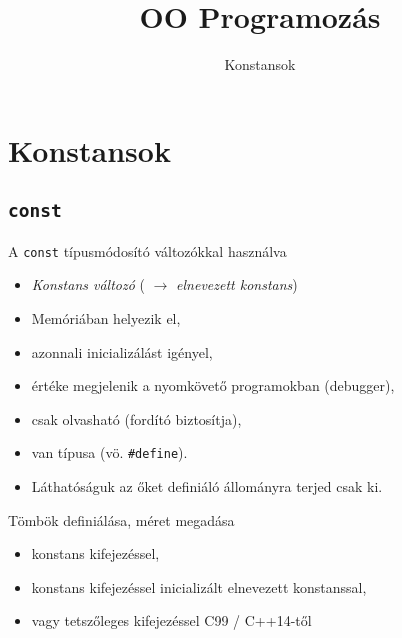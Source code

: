 \documentclass[usenames,dvipsnames,aspectratio=169]{beamer}
\title[OO Programozás - C++]{OO Programozás}
\subtitle{Konstansok}
\begin{document}
\begin{frame}[plain]
  \titlepage
  \logoalul
\end{frame}

\section{Konstansok}

\subsection{\texttt{const}}

\begin{frame}
    A \texttt{const} típusmódosító változókkal használva
    \begin{itemize}
        \footnotesize
        \item \emph{Konstans változó} ( $\to$ \emph{elnevezett konstans})
        \item Memóriában helyezik el,
        \item azonnali inicializálást igényel, 
        \item értéke megjelenik a nyomkövető programokban (debugger),
        \item csak olvasható (fordító biztosítja),
        \item van típusa (vö. \texttt{\#define}).
        \item Láthatóságuk az őket definiáló állományra terjed csak ki.
    \end{itemize}
    \vfill
    Tömbök definiálása, méret megadása
    \begin{itemize}
        \footnotesize
        \item konstans kifejezéssel,
        \item konstans kifejezéssel inicializált elnevezett konstanssal,
        \item vagy tetszőleges kifejezéssel C99 / C++14-től
    \end{itemize}
\end{frame}

\begin{frame}
    \begin{exampleblock}{}
        
    \end{exampleblock}
\end{frame}

\begin{frame}
    \begin{exampleblock}{}
        \small
        
    \end{exampleblock}
\end{frame}
\end{document}
